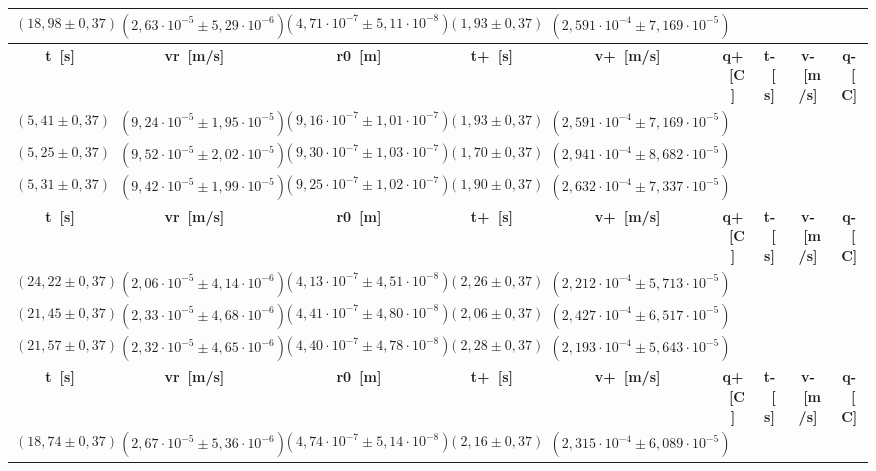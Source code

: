 \documentclass{article}
\begin{document}
\begin{table}[H]
\begin{flushleft}
\begin{tabular}{|c|c|c|c|c|c|c|c|c|}
        \((18,98 \pm 0,37)\) & \((2,63 \cdot 10^{-5} \pm 5,29 \cdot 10^{-6})\) & \((4,71 \cdot 10^{-7} \pm 5,11 \cdot 10^{-8})\) & \((1,93 \pm 0,37)\) & \((2,591 \cdot 10^{-4} \pm 7,169 \cdot 10^{-5})\) \\
        \toprule
        \textbf{t~[s]} & \textbf{vr~[m/s]} & \textbf{r0~[m]} & \textbf{t+~[s]} & \textbf{v+~[m/s]} & \textbf{q+~[C]} & \textbf{t-~[s]} & \textbf{v-~[m/s]} & \textbf{q-~[C]} \\
        \midrule
        \((5,41 \pm 0,37)\) & \((9,24 \cdot 10^{-5} \pm 1,95 \cdot 10^{-5})\) & \((9,16 \cdot 10^{-7} \pm 1,01 \cdot 10^{-7})\) & \((1,93 \pm 0,37)\) & \((2,591 \cdot 10^{-4} \pm 7,169 \cdot 10^{-5})\) \\
        \((5,25 \pm 0,37)\) & \((9,52 \cdot 10^{-5} \pm 2,02 \cdot 10^{-5})\) & \((9,30 \cdot 10^{-7} \pm 1,03 \cdot 10^{-7})\) & \((1,70 \pm 0,37)\) & \((2,941 \cdot 10^{-4} \pm 8,682 \cdot 10^{-5})\) \\
        \((5,31 \pm 0,37)\) & \((9,42 \cdot 10^{-5} \pm 1,99 \cdot 10^{-5})\) & \((9,25 \cdot 10^{-7} \pm 1,02 \cdot 10^{-7})\) & \((1,90 \pm 0,37)\) & \((2,632 \cdot 10^{-4} \pm 7,337 \cdot 10^{-5})\) \\
        \toprule
        \textbf{t~[s]} & \textbf{vr~[m/s]} & \textbf{r0~[m]} & \textbf{t+~[s]} & \textbf{v+~[m/s]} & \textbf{q+~[C]} & \textbf{t-~[s]} & \textbf{v-~[m/s]} & \textbf{q-~[C]} \\
        \midrule
        \((24,22 \pm 0,37)\) & \((2,06 \cdot 10^{-5} \pm 4,14 \cdot 10^{-6})\) & \((4,13 \cdot 10^{-7} \pm 4,51 \cdot 10^{-8})\) & \((2,26 \pm 0,37)\) & \((2,212 \cdot 10^{-4} \pm 5,713 \cdot 10^{-5})\) \\
        \((21,45 \pm 0,37)\) & \((2,33 \cdot 10^{-5} \pm 4,68 \cdot 10^{-6})\) & \((4,41 \cdot 10^{-7} \pm 4,80 \cdot 10^{-8})\) & \((2,06 \pm 0,37)\) & \((2,427 \cdot 10^{-4} \pm 6,517 \cdot 10^{-5})\) \\
        \((21,57 \pm 0,37)\) & \((2,32 \cdot 10^{-5} \pm 4,65 \cdot 10^{-6})\) & \((4,40 \cdot 10^{-7} \pm 4,78 \cdot 10^{-8})\) & \((2,28 \pm 0,37)\) & \((2,193 \cdot 10^{-4} \pm 5,643 \cdot 10^{-5})\) \\
        \toprule
        \textbf{t~[s]} & \textbf{vr~[m/s]} & \textbf{r0~[m]} & \textbf{t+~[s]} & \textbf{v+~[m/s]} & \textbf{q+~[C]} & \textbf{t-~[s]} & \textbf{v-~[m/s]} & \textbf{q-~[C]} \\
        \midrule
        \((18,74 \pm 0,37)\) & \((2,67 \cdot 10^{-5} \pm 5,36 \cdot 10^{-6})\) & \((4,74 \cdot 10^{-7} \pm 5,14 \cdot 10^{-8})\) & \((2,16 \pm 0,37)\) & \((2,315 \cdot 10^{-4} \pm 6,089 \cdot 10^{-5})\) \\

\end{tabular}
\end{flushleft}
\end{table}
\end{document}
